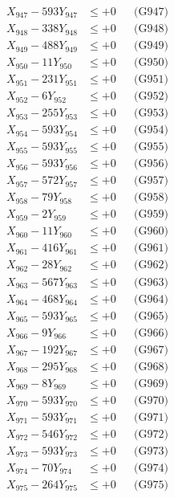 \documentclass[a4paper,10pt]{article}
\begin{document}
{\begin{align}
X_{947} - 593Y_{947} &\leq +0 && \text{(G947)} \\
X_{948} - 338Y_{948} &\leq +0 && \text{(G948)} \\
X_{949} - 488Y_{949} &\leq +0 && \text{(G949)} \\
X_{950} - 11Y_{950} &\leq +0 && \text{(G950)} \\
\allowbreak
X_{951} - 231Y_{951} &\leq +0 && \text{(G951)} \\
X_{952} - 6Y_{952} &\leq +0 && \text{(G952)} \\
X_{953} - 255Y_{953} &\leq +0 && \text{(G953)} \\
X_{954} - 593Y_{954} &\leq +0 && \text{(G954)} \\
X_{955} - 593Y_{955} &\leq +0 && \text{(G955)} \\
X_{956} - 593Y_{956} &\leq +0 && \text{(G956)} \\
X_{957} - 572Y_{957} &\leq +0 && \text{(G957)} \\
X_{958} - 79Y_{958} &\leq +0 && \text{(G958)} \\
X_{959} - 2Y_{959} &\leq +0 && \text{(G959)} \\
X_{960} - 11Y_{960} &\leq +0 && \text{(G960)} \\
\allowbreak
X_{961} - 416Y_{961} &\leq +0 && \text{(G961)} \\
X_{962} - 28Y_{962} &\leq +0 && \text{(G962)} \\
X_{963} - 567Y_{963} &\leq +0 && \text{(G963)} \\
X_{964} - 468Y_{964} &\leq +0 && \text{(G964)} \\
X_{965} - 593Y_{965} &\leq +0 && \text{(G965)} \\
X_{966} - 9Y_{966} &\leq +0 && \text{(G966)} \\
X_{967} - 192Y_{967} &\leq +0 && \text{(G967)} \\
X_{968} - 295Y_{968} &\leq +0 && \text{(G968)} \\
X_{969} - 8Y_{969} &\leq +0 && \text{(G969)} \\
X_{970} - 593Y_{970} &\leq +0 && \text{(G970)} \\
\allowbreak
X_{971} - 593Y_{971} &\leq +0 && \text{(G971)} \\
X_{972} - 546Y_{972} &\leq +0 && \text{(G972)} \\
X_{973} - 593Y_{973} &\leq +0 && \text{(G973)} \\
X_{974} - 70Y_{974} &\leq +0 && \text{(G974)} \\
X_{975} - 264Y_{975} &\leq +0 && \text{(G975)} \\

\end{align}}
\end{document}
